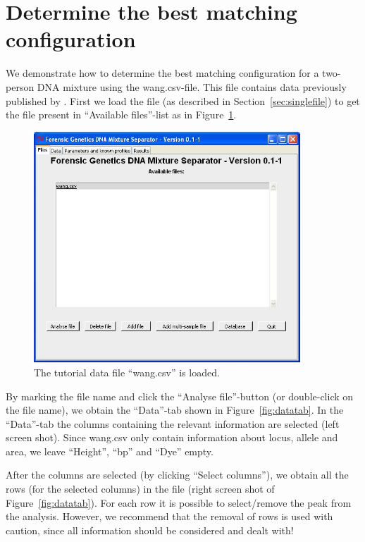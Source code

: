 \documentclass[a4paper,11pt]{article}
\begin{document}

\section{Determine the best matching configuration}
\label{sec:wangbm}

We demonstrate how to determine the best matching configuration for a
two-person DNA mixture using the wang.csv-file. This file contains
data previously published by \citet{wang2006}. First we load the file
(as described in Section~\ref{sec:singlefile}) to get the file present
in ``Available files''-list as in Figure~\ref{fig:wangload}.

\begin{figure}[!h]
  \centering
  \includegraphics[width=10cm]{files_singlefile}
  \caption{\label{fig:wangload}The tutorial data file ``wang.csv'' is loaded.}
\end{figure}

By marking the file name and click the ``Analyse file''-button (or
double-click on the file name), we obtain the ``Data''-tab shown in
Figure~\ref{fig:datatab}. In the ``Data''-tab the columns containing
the relevant information are selected (left screen shot). Since
wang.csv only contain information about locus, allele and area, we
leave ``Height'', ``bp'' and ``Dye'' empty.

After the columns are selected (by clicking ``Select columns''), we
obtain all the rows (for the selected columns) in the file (right
screen shot of Figure~\ref{fig:datatab}). For each row it is possible
to select/remove the peak from the analysis. However, we recommend
that the removal of rows is used with caution, since all information
should be considered and dealt with!
\end{document}
